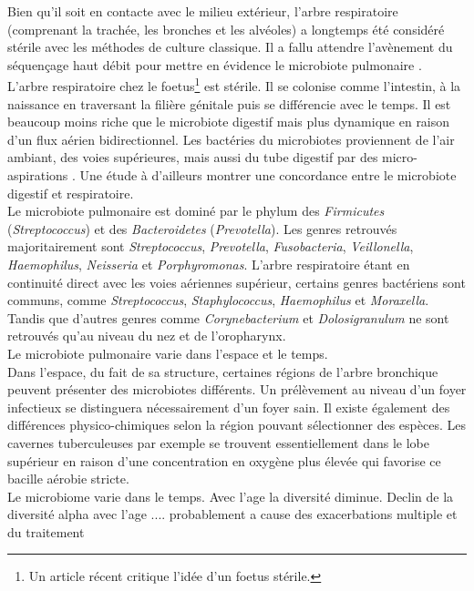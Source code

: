 \documentclass[12pt,a4paper]{article}
\begin{document}
Bien qu'il soit en contacte avec le milieu extérieur, l’arbre respiratoire (comprenant la trachée, les bronches et les alvéoles) a longtemps été considéré stérile avec les méthodes de culture classique. Il a fallu attendre l’avènement du séquençage haut débit pour mettre en évidence le microbiote pulmonaire \cite{HoMan2017,Beck,Dicksonb}.\\
L'arbre respiratoire chez le foetus\footnote{Un article récent critique l'idée d'un foetus stérile.} est stérile. Il se colonise comme l'intestin, à la naissance en traversant la filière génitale puis se différencie avec le temps. Il est beaucoup moins riche que le microbiote digestif mais plus dynamique en raison d'un flux aérien bidirectionnel.  Les bactéries du microbiotes proviennent de l’air ambiant, des voies supérieures,  mais aussi du tube digestif par des micro-aspirations \cite{Dickson}. Une étude à d'ailleurs montrer une concordance entre le microbiote digestif et respiratoire\cite{Dickson}.\\
Le microbiote pulmonaire est dominé par le phylum des \textit{Firmicutes} (\textit{Streptococcus}) et des \textit{Bacteroidetes} (\textit{Prevotella}). Les genres retrouvés majoritairement sont \textit{Streptococcus}, \textit{Prevotella}, \textit{Fusobacteria}, \textit{Veillonella}, \textit{Haemophilus}, \textit{Neisseria} et \textit{Porphyromonas}.
L’arbre respiratoire étant en continuité direct avec les voies aériennes supérieur, certains genres bactériens sont communs, comme \textit{Streptococcus}, \textit{Staphylococcus}, \textit{Haemophilus} et \textit{Moraxella}. Tandis que d’autres genres comme \textit{Corynebacterium} et \textit{Dolosigranulum} ne sont retrouvés qu’au niveau du nez et de l'oropharynx. \\
Le microbiote pulmonaire varie dans l’espace et le temps. \\
Dans l’espace, du fait de sa structure, certaines régions de l'arbre bronchique peuvent présenter des microbiotes différents. Un prélèvement au niveau d'un foyer infectieux se distinguera nécessairement d'un foyer sain. Il existe également des différences physico-chimiques selon la région pouvant sélectionner des espèces. Les cavernes tuberculeuses par exemple se trouvent essentiellement dans le lobe supérieur en raison d'une concentration en oxygène plus élevée qui favorise ce bacille aérobie stricte. \\
Le microbiome varie dans le temps. Avec l'age la diversité diminue. 
Declin de la diversité alpha avec l'age .... probablement a cause des exacerbations multiple et du traitement
\end{document}
